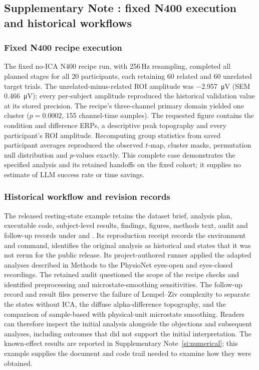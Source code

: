 \subsection*{Supplementary Note \thesuppnote: fixed N400 execution and historical workflows}
\label{si:workflows}

\subsubsection*{Fixed N400 recipe execution}

The fixed no-ICA N400 recipe run, with 256\,Hz resampling, completed all planned stages for all 20 participants, each retaining 60 related and 60 unrelated target trials. The unrelated-minus-related ROI amplitude was \SI{-2.957}{\uV} (SEM \SI{0.466}{\uV}); every per-subject amplitude reproduced the historical validation value at its stored precision. The recipe's three-channel primary domain yielded one cluster ($p = 0.0002$, 155 channel-time samples). The requested figure contains the condition and difference ERPs, a descriptive peak topography and every participant's ROI amplitude. Recomputing group statistics from saved participant averages reproduced the observed $t$-map, cluster masks, permutation null distribution and $p$-values exactly. This complete case demonstrates the specified analysis and its retained handoffs on the fixed cohort; it supplies no estimate of LLM success rate or time savings.

\subsubsection*{Historical workflow and revision records}

The released resting-state example retains the dataset brief, analysis plan, executable code, subject-level results, findings, figures, methods text, audit and follow-up records under  and . Its reproduction receipt records the environment and command, identifies the original analysis as historical and states that it was not rerun for the public release. Its project-authored runner applied the adapted analyses described in Methods to the PhysioNet eyes-open and eyes-closed recordings. The retained audit questioned the scope of the recipe checks and identified preprocessing and microstate-smoothing sensitivities. The follow-up record and result files preserve the failure of Lempel--Ziv complexity to separate the states without ICA, the diffuse alpha-difference topography, and the comparison of sample-based with physical-unit microstate smoothing. Readers can therefore inspect the initial analysis alongside the objections and subsequent analyses, including outcomes that did not support the initial interpretation. The known-effect results are reported in Supplementary Note~\ref*{si:numerical}; this example supplies the document and code trail needed to examine how they were obtained.



